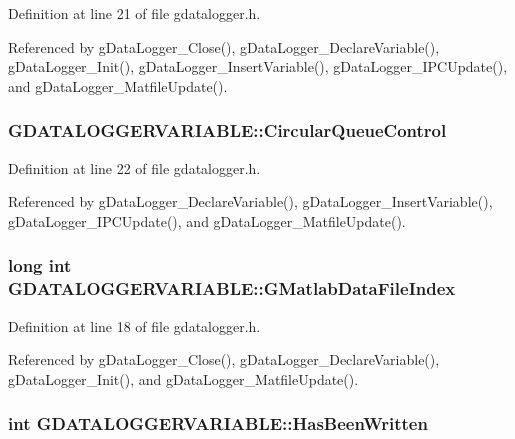 Definition at line 21 of file gdatalogger.h.



Referenced by gDataLogger\_\-Close(), gDataLogger\_\-DeclareVariable(), gDataLogger\_\-Init(), gDataLogger\_\-InsertVariable(), gDataLogger\_\-IPCUpdate(), and gDataLogger\_\-MatfileUpdate().

\hypertarget{structGDATALOGGERVARIABLE_a1a50747d2223f228288b4656470d9bbc}{
\subsubsection[{CircularQueueControl}]{ {\bf GDATALOGGERVARIABLE::CircularQueueControl}}}
\label{structGDATALOGGERVARIABLE_a1a50747d2223f228288b4656470d9bbc}


Definition at line 22 of file gdatalogger.h.



Referenced by gDataLogger\_\-DeclareVariable(), gDataLogger\_\-InsertVariable(), gDataLogger\_\-IPCUpdate(), and gDataLogger\_\-MatfileUpdate().

\hypertarget{structGDATALOGGERVARIABLE_aa1cd5b838d8655734e7d4499b25bf22a}{
\subsubsection[{GMatlabDataFileIndex}]{\setlength{\rightskip}{0pt plus 5cm}long int {\bf GDATALOGGERVARIABLE::GMatlabDataFileIndex}}}
\label{structGDATALOGGERVARIABLE_aa1cd5b838d8655734e7d4499b25bf22a}


Definition at line 18 of file gdatalogger.h.



Referenced by gDataLogger\_\-Close(), gDataLogger\_\-DeclareVariable(), gDataLogger\_\-Init(), and gDataLogger\_\-MatfileUpdate().

\hypertarget{structGDATALOGGERVARIABLE_ad982aef10e8496c2a1c6b9bb1f1dc5c3}{
\subsubsection[{HasBeenWritten}]{\setlength{\rightskip}{0pt plus 5cm}int {\bf GDATALOGGERVARIABLE::HasBeenWritten}}}
\label{structGDATALOGGERVARIABLE_ad982aef10e8496c2a1c6b9bb1f1dc5c3}


